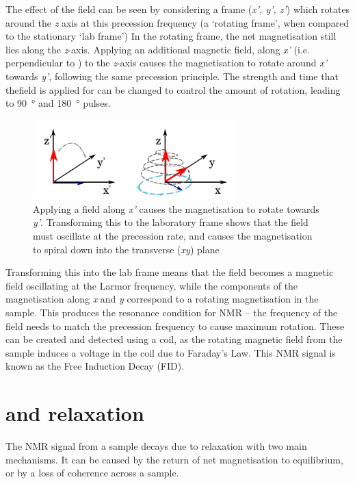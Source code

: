 The effect of the \Bone field can be seen by considering a frame (\textit{x', y', z'}) which rotates around the \textit{z} axis at this precession frequency (a `rotating frame', when compared to the stationary `lab frame')
In the rotating frame, the net magnetisation still lies along the \textit{z}-axis.
Applying an additional magnetic field, along \textit{x'} (i.e. perpendicular to \Bzero) to the \textit{z}-axis causes the magnetisation to rotate around \textit{x'} towards \textit{y'}, following the same precession principle.
The strength and time that the\Bone field is applied for can be changed to control the amount of rotation, leading to \SI{90}{\degree} and \SI{180}{\degree} pulses.

\begin{figure}[t]
\centering
\includegraphics[width=0.7\textwidth]{figures/background/fid.pdf}
\caption{Applying a \Bone field along \textit{x'} causes the magnetisation to rotate towards \textit{y'}. Transforming this to the laboratory frame shows that the \Bone field must oscillate at the precession rate, and causes the magnetisation to spiral down into the transverse (\textit{xy}) plane}
\label{fig:back-fid}
\end{figure}

Transforming this into the lab frame means that the \Bone field becomes a magnetic field oscillating at the Larmor frequency,
while the components of the magnetisation along \textit{x} and \textit{y} correspond to a rotating magnetisation in the sample.
This produces the resonance condition for NMR -- the frequency of the \Bone field needs to match the precession frequency to cause maximum rotation.
These can be created and detected using a coil, as the rotating magnetic field from the sample induces a voltage in the coil due to Faraday's Law.
This NMR signal is known as the Free Induction Decay (FID).

\section{\Tone and \Ttwo relaxation}
The NMR signal from a sample decays due to relaxation with two main mechanisms.
It can be caused by the return of net magnetisation to equilibrium, or by a loss of coherence across a sample.

